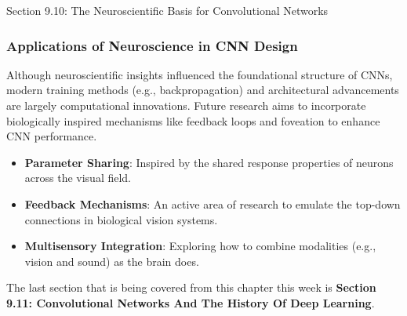 \begin{notes}{Section 9.10: The Neuroscientific Basis for Convolutional Networks}
    \subsubsection*{Applications of Neuroscience in CNN Design}
    
    Although neuroscientific insights influenced the foundational structure of CNNs, modern training methods (e.g., backpropagation) and architectural advancements are largely computational innovations. 
    Future research aims to incorporate biologically inspired mechanisms like feedback loops and foveation to enhance CNN performance.
    
    \begin{highlight}
        \begin{itemize}
            \item \textbf{Parameter Sharing}: Inspired by the shared response properties of neurons across the visual field.
            \item \textbf{Feedback Mechanisms}: An active area of research to emulate the top-down connections in biological vision systems.
            \item \textbf{Multisensory Integration}: Exploring how to combine modalities (e.g., vision and sound) as the brain does.
        \end{itemize}
    \end{highlight}
\end{notes}

The last section that is being covered from this chapter this week is \textbf{Section 9.11: Convolutional Networks And The History Of Deep Learning}.

